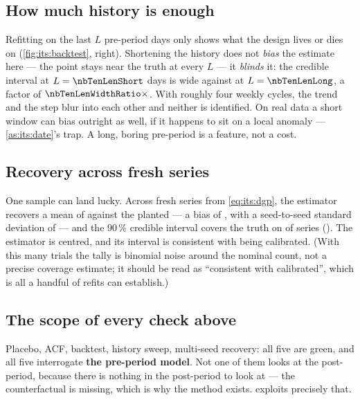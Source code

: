 \subsection*{How much history is enough}

Refitting on the last $L$ pre-period days only shows what the design lives or dies on
(\cref{fig:its:backtest}, right). Shortening the history does not \emph{bias} the estimate here ---
the point stays near the truth at every $L$ --- it \emph{blinds} it: the credible interval at
$L = \nbTenLenShort$ days is \pp{\nbTenLenShortWidth} wide against \pp{\nbTenLenLongWidth} at
$L = \nbTenLenLong$, a factor of $\nbTenLenWidthRatio\times$. With roughly four weekly cycles, the
trend and the step blur into each other and neither is identified. On real data a short window can
bias outright as well, if it happens to sit on a local anomaly --- \cref{as:its:date}'s trap. A
long, boring pre-period is a feature, not a cost.



\subsection*{Recovery across fresh series}

One sample can land lucky. Across \nbTenNSeed{} fresh series from \cref{eq:its:dgp}, the estimator
recovers a mean of \pp{\nbTenSeedMean} against the planted \pp{+\nbTenTrueLift} --- a bias of
\pp{\nbTenSeedBias}, with a seed-to-seed standard deviation of \pp{\nbTenSeedSd} --- and the
90\,\% credible interval covers the truth on \nbTenSeedCov{} of \nbTenNSeed{} series
(\pc{\nbTenSeedCovPct}). The estimator is centred, and its interval is consistent with being
calibrated. (With this many trials the tally is binomial noise around the nominal count, not a
precise coverage estimate; it should be read as ``consistent with calibrated'', which is all a
handful of refits can establish.)

\subsection*{The scope of every check above}

Placebo, ACF, backtest, history sweep, multi-seed recovery: all five are green, and all five
interrogate \textbf{the pre-period model}. Not one of them looks at the post-period, because there
is nothing in the post-period to look at --- the counterfactual is missing, which is why the method
exists.  exploits precisely that.


